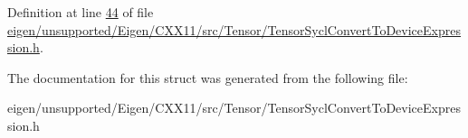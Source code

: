 Definition at line \hyperlink{eigen_2unsupported_2_eigen_2_c_x_x11_2src_2_tensor_2_tensor_sycl_convert_to_device_expression_8h_source_l00044}{44} of file \hyperlink{eigen_2unsupported_2_eigen_2_c_x_x11_2src_2_tensor_2_tensor_sycl_convert_to_device_expression_8h_source}{eigen/unsupported/\+Eigen/\+C\+X\+X11/src/\+Tensor/\+Tensor\+Sycl\+Convert\+To\+Device\+Expression.\+h}.



The documentation for this struct was generated from the following file\+:\begin{DoxyCompactItemize}
\item 
eigen/unsupported/\+Eigen/\+C\+X\+X11/src/\+Tensor/\+Tensor\+Sycl\+Convert\+To\+Device\+Expression.\+h\end{DoxyCompactItemize}
